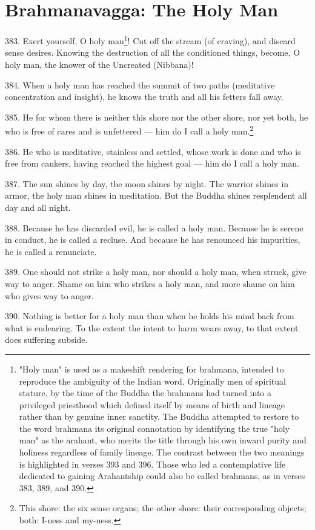 \newpage
\chapter{Brahmanavagga: The Holy Man}
383. Exert yourself, O holy man\footnote{"Holy man" is used as a makeshift rendering for brahmana, intended to reproduce the ambiguity of the Indian word. Originally men of spiritual stature, by the time of the Buddha the brahmans had turned into a privileged priesthood which defined itself by means of birth and lineage rather than by genuine inner sanctity. The Buddha attempted to restore to the word brahmana its original connotation by identifying the true "holy man" as the arahant, who merits the title through his own inward purity and holiness regardless of family lineage. The contrast between the two meanings is highlighted in verses 393 and 396. Those who led a contemplative life dedicated to gaining Arahantship could also be called brahmans, as in verses 383, 389, and 390.}! Cut off the stream (of craving), and discard sense desires. Knowing the destruction of all the conditioned things, become, O holy man, the knower of the Uncreated (Nibbana)!

384. When a holy man has reached the summit of two paths (meditative concentration and insight), he knows the truth and all his fetters fall away.

385. He for whom there is neither this shore nor the other shore, nor yet both, he who is free of cares and is unfettered — him do I call a holy man.\footnote{This shore: the six sense organs; the other shore: their corresponding objects; both: I-ness and my-ness.}

386. He who is meditative, stainless and settled, whose work is done and who is free from cankers, having reached the highest goal — him do I call a holy man.

387. The sun shines by day, the moon shines by night. The warrior shines in armor, the holy man shines in meditation. But the Buddha shines resplendent all day and all night.

388. Because he has discarded evil, he is called a holy man. Because he is serene in conduct, he is called a recluse. And because he has renounced his impurities, he is called a renunciate.

389. One should not strike a holy man, nor should a holy man, when struck, give way to anger. Shame on him who strikes a holy man, and more shame on him who gives way to anger.

390. Nothing is better for a holy man than when he holds his mind back from what is endearing. To the extent the intent to harm wears away, to that extent does suffering subside.

